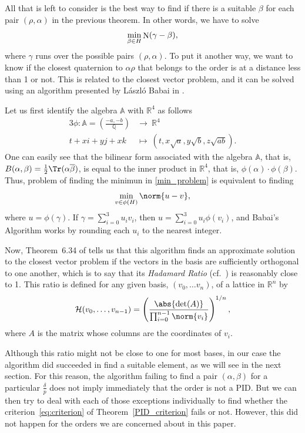 \documentclass[10pt]{article}
\theoremstyle{definition}
\newcommand\A{\mathbb{A}}
\newcommand\QQ{\mathbb{Q}}
\newcommand\RR{\mathbb{R}}
\newcommand\hh{\mathcal{H}}
\newcommand\N{\mathop{\rm N}\nolimits}
\begin{document}
All that is left to consider is the best way to find if there is a
suitable $\beta$ for each pair $\left( \rho, \alpha \right)$ in the
previous theorem. In other words, we have to solve
%
\begin{equation}\label{min_problem}
  \min_{\beta \in H} \N(\gamma - \beta),
\end{equation}
%
where $\gamma$ runs over the possible pairs $(\rho,\alpha)$. To put it
another way, we want to know if the closest quaternion to
$\alpha \rho$ that belongs to the order is at a distance less than 1
or not. This is related to the closest vector problem, and it can be
solved using an algorithm presented by László Babai in \cite{Babai}.

Let us first identify the algebra $\A$ with $\RR^4$ as follows
%
\begin{alignat*}{3}
  \phi \colon \A = \left(\frac{-a,-b}{\QQ} \right) & \longrightarrow
  \ \RR^4 \\
  t + x i + y j + x k \ & \longmapsto \
  (t,x\sqrt{a},y\sqrt{b},z\sqrt{ab}).
\end{alignat*}
%
One can easily see that the bilinear form associated with the algebra
$\A$, that is,
$B(\alpha, \beta) =\frac{1}{2} \Tr(\alpha\overline{\beta})$, is equal
to the inner product in $\RR^4$, that is,
$\phi(\alpha) \cdot \phi(\beta)$. Thus, problem of finding the minimun
in \eqref{min_problem} is equivalent to finding
%
\[ \min_{v \in \phi(H)} \norm{u-v}, \]
%
where $u=\phi(\gamma)$. If $\gamma = \sum_{i=0}^3 u_i v_i$, then
$u= \sum_{i=0}^3 u_i \phi(v_i)$, and Babai's Algorithm works by
rounding each $u_i$ to the nearest integer.

Now, Theorem~6.34 of \cite[p.~380]{Cript} tells us that this algorithm
finds an approximate solution to the closest vector problem if the
vectors in the basis are sufficiently orthogonal to one another, which
is to say that its \textit{Hadamard Ratio} (cf.~\cite[p.~373]{Cript})
is reasonably close to 1. This ratio is defined for any given basis,
$(v_0, \dots v_n)$, of a lattice in $\RR^n$ by
\[ \hh(v_0,\dots,v_{n-1}) =
\left(\frac{\abs{\det(A)}}{\prod_{i=0}^{n-1}\norm{v_i}}
\right)^{1/n},\] where $A$ is the matrix whose columns are the
coordinates of $v_i$.

Although this ratio might not be close to one for most bases, in our
case the algorithm did succeeded in find a suitable element, as we
will see in the next section. For this reason, the algorithm failing
to find a pair $(\alpha, \beta)$ for a particular $\frac{\delta}{p}$
does not imply immediately that the order is not a PID. But we can
then try to deal with each of those exceptions individually to find
whether the criterion~\eqref{eq:criterion} of
Theorem~\ref{PID_criterion} fails or not. However, this did not happen
for the orders we are concerned about in this paper.
\end{document}

